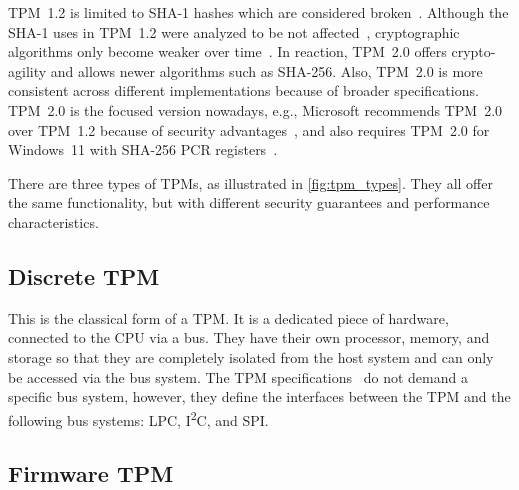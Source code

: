 %


TPM~1.2 is limited to SHA-1 hashes which are considered broken~\cite{cryptoeprint:2005/010, Wang2005, Stevens2017}.
Although the SHA-1 uses in TPM~1.2 were analyzed to be not affected~\cite{sha1tpm12}, cryptographic algorithms only become weaker over time~\cite{Arthur2015}.
In reaction, TPM~2.0 offers crypto-agility and allows newer algorithms such as SHA-256.
Also, TPM~2.0 is more consistent across different implementations because of broader specifications.
TPM~2.0 is the focused version nowadays, e.g., Microsoft recommends TPM~2.0 over TPM~1.2 because of security advantages~\cite{micrec}, and also requires TPM~2.0 for Windows~11 with SHA-256 PCR registers~\cite{win11req}.




There are three types of TPMs, as illustrated in \autoref{fig:tpm_types}.
They all offer the same functionality, but with different security guarantees and performance characteristics.


\subsection{Discrete TPM}

This is the classical form of a TPM\@.
It is a dedicated piece of hardware, connected to the CPU via a bus.
They have their own processor, memory, and storage so that they are completely isolated from the host system and can only be accessed via the bus system.
The TPM specifications~\cite{tpm20, tcgPcClient} do not demand a specific bus system, however, they define the interfaces between the TPM and the following bus systems: LPC, I\textsuperscript{2}C, and SPI\@.


\subsection{Firmware TPM}

